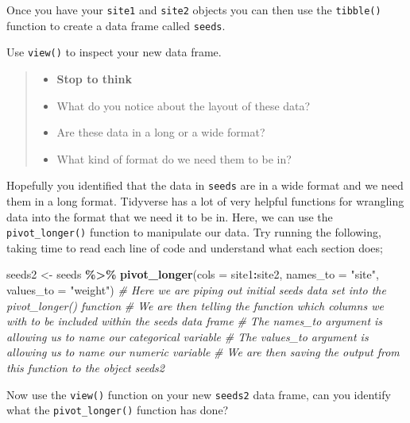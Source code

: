 \documentclass[
]{book}
\newenvironment{Shaded}{\begin{snugshade}}{\end{snugshade}}
\newcommand{\AttributeTok}[1]{\textcolor[rgb]{0.13,0.29,0.53}{#1}}
\newcommand{\CommentTok}[1]{\textcolor[rgb]{0.56,0.35,0.01}{\textit{#1}}}
\newcommand{\FunctionTok}[1]{\textcolor[rgb]{0.13,0.29,0.53}{\textbf{#1}}}
\newcommand{\NormalTok}[1]{#1}
\newcommand{\OtherTok}[1]{\textcolor[rgb]{0.56,0.35,0.01}{#1}}
\newcommand{\SpecialCharTok}[1]{\textcolor[rgb]{0.81,0.36,0.00}{\textbf{#1}}}
\newcommand{\StringTok}[1]{\textcolor[rgb]{0.31,0.60,0.02}{#1}}
\providecommand{\tightlist}{%
  \setlength{\itemsep}{0pt}\setlength{\parskip}{0pt}}
\begin{document}
Once you have your \texttt{site1} and \texttt{site2} objects you can then use the \texttt{tibble()} function to create a data frame called \texttt{seeds}.

Use \texttt{view()} to inspect your new data frame.

\begin{quote}
\begin{itemize}
\tightlist
\item
  \textbf{Stop to think}
\item
  What do you notice about the layout of these data?
\item
  Are these data in a long or a wide format?
\item
  What kind of format do we need them to be in?
\end{itemize}
\end{quote}

Hopefully you identified that the data in \texttt{seeds} are in a wide format and we need them in a long format. Tidyverse has a lot of very helpful functions for wrangling data into the format that we need it to be in. Here, we can use the \texttt{pivot\_longer()} function to manipulate our data. Try running the following, taking time to read each line of code and understand what each section does;

\begin{Shaded}
\begin{Highlighting}[]
\NormalTok{seeds2 }\OtherTok{\textless{}{-}}\NormalTok{ seeds }\SpecialCharTok{\%\textgreater{}\%}
  \FunctionTok{pivot\_longer}\NormalTok{(}\AttributeTok{cols =}\NormalTok{ site1}\SpecialCharTok{:}\NormalTok{site2,}
             \AttributeTok{names\_to =} \StringTok{"site"}\NormalTok{, }
             \AttributeTok{values\_to =} \StringTok{"weight"}\NormalTok{)}
\CommentTok{\# Here we are piping out initial seeds data set into the pivot\_longer() function}
\CommentTok{\# We are then telling the function which columns we with to be included within the seeds data frame}
\CommentTok{\# The names\_to argument is allowing us to name our categorical variable }
\CommentTok{\# The values\_to argument is allowing us to name our numeric variable}
\CommentTok{\# We are then saving the output from this function to the object seeds2}
\end{Highlighting}
\end{Shaded}

Now use the \texttt{view()} function on your new \texttt{seeds2} data frame, can you identify what the \texttt{pivot\_longer()} function has done?
\end{document}
